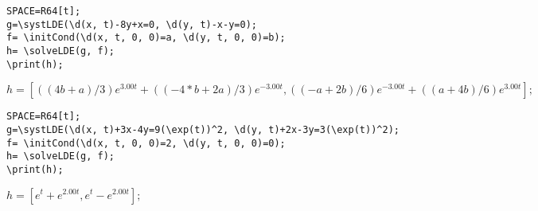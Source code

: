 \begin{verbatim}
SPACE=R64[t];
g=\systLDE(\d(x, t)-8y+x=0, \d(y, t)-x-y=0);
f= \initCond(\d(x, t, 0, 0)=a, \d(y, t, 0, 0)=b);
h= \solveLDE(g, f);  
\print(h);
\end{verbatim}

{$h = [((4b+a)/3)e^{3.00t}+((-4*b+2a)/3)e^{-3.00t},
((-a+2b)/6)e^{-3.00t}+((a+4b)/6)e^{3.00t}];$}

\begin{verbatim}
SPACE=R64[t];
g=\systLDE(\d(x, t)+3x-4y=9(\exp(t))^2, \d(y, t)+2x-3y=3(\exp(t))^2);
f= \initCond(\d(x, t, 0, 0)=2, \d(y, t, 0, 0)=0);
h= \solveLDE(g, f);  
\print(h);
\end{verbatim}

{$h = [e^{t}+e^{2.00t},e^{t}-e^{2.00t}];$}

